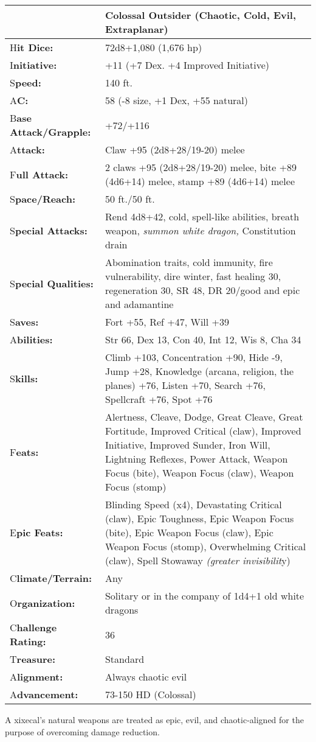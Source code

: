 \documentclass{article}
\begin{document}
\begin{tabular}{|>{\raggedright}p{68pt}|>{\raggedright}p{258pt}|}
\hline
  & Colossal Outsider (Chaotic, Cold, Evil, Extraplanar) \tabularnewline
\hline
H\textbf{it Dice:} &  72d8+1,080 (1,676 hp) \tabularnewline
\hline
I\textbf{nitiative:} &  +11 (+7 Dex. +4 Improved Initiative) \tabularnewline
\hline
S\textbf{peed:} &  140 ft. \tabularnewline
\hline
A\textbf{C:} &  58 (-8 size, +1 Dex, +55 natural) \tabularnewline
\hline
B\textbf{ase Attack/Grapple:} &  +72/+116\tabularnewline
\hline
A\textbf{ttack:} &  Claw +95 (2d8+28/19-20) melee\tabularnewline
\hline
F\textbf{ull Attack:} &  2 claws +95 (2d8+28/19-20) melee, bite +89 (4d6+14) melee, 
stamp +89 (4d6+14) melee \tabularnewline
\hline
S\textbf{pace/Reach:} &  50 ft./50 ft. \tabularnewline
\hline
S\textbf{pecial Attacks:} &  Rend 4d8+42, cold, spell-like abilities, breath weapon, 
\textit{summon white dragon, }Constitution drain \tabularnewline
\hline
S\textbf{pecial Qualities:} &  Abomination traits, cold immunity, fire vulnerability, 
dire winter, fast healing 30, regeneration 30, SR 48, DR 20/good and epic and adamantine 
\tabularnewline
\hline
S\textbf{aves:} &  Fort +55, Ref +47, Will +39 \tabularnewline
\hline
A\textbf{bilities:} &  Str 66, Dex 13, Con 40, Int 12, Wis 8, Cha 34 \tabularnewline
\hline
S\textbf{kills:} & Climb +103, Concentration +90, Hide -9, Jump +28, Knowledge 
(arcana, religion, the planes) +76, Listen +70, Search +76, Spellcraft +76, Spot 
+76\tabularnewline
\hline
F\textbf{eats:} & Alertness, Cleave, Dodge, Great Cleave, Great Fortitude, Improved 
Critical (claw), Improved Initiative, Improved Sunder, Iron Will, Lightning Reflexes, 
Power Attack, Weapon Focus (bite), Weapon Focus (claw), Weapon Focus (stomp)\tabularnewline
\hline
E\textbf{pic Feats:} & Blinding Speed (x4), Devastating Critical (claw), Epic Toughness, 
Epic Weapon Focus (bite), Epic Weapon Focus (claw), Epic Weapon Focus (stomp), 
Overwhelming Critical (claw), Spell Stowaway \textit{(greater invisibilit}y) \tabularnewline
\hline
C\textbf{limate/Terrain:} &  Any \tabularnewline
\hline
O\textbf{rganization:} &  Solitary or in the company of 1d4+1 old white dragons 
\tabularnewline
\hline
C\textbf{hallenge Rating:} &  36 \tabularnewline
\hline
T\textbf{reasure:} &  Standard \tabularnewline
\hline
A\textbf{lignment:} &  Always chaotic evil \tabularnewline
\hline
A\textbf{dvancement:} &  73-150 HD (Colossal) \tabularnewline
\hline
\end{tabular}

A xixecal's natural weapons are treated as epic, evil, and chaotic-aligned for 
the purpose of overcoming damage reduction.
\end{document}
